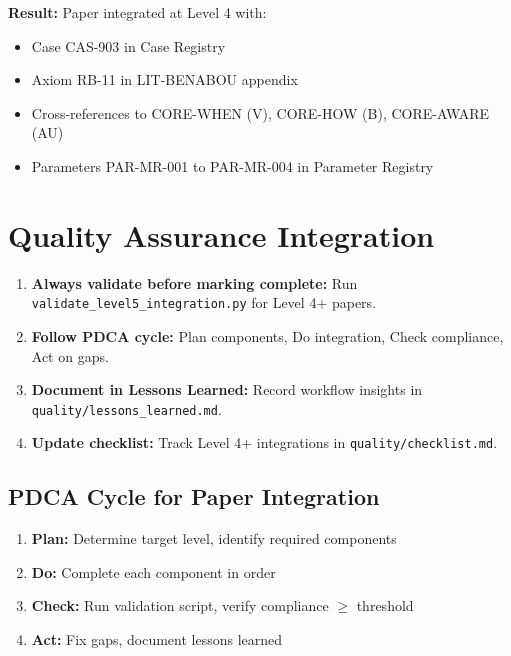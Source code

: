 \textbf{Result:} Paper integrated at Level 4 with:
\begin{itemize}[nosep]
\item Case CAS-903 in Case Registry
\item Axiom RB-11 in LIT-BENABOU appendix
\item Cross-references to CORE-WHEN (V), CORE-HOW (B), CORE-AWARE (AU)
\item Parameters PAR-MR-001 to PAR-MR-004 in Parameter Registry
\end{itemize}


\section{Quality Assurance Integration}
\label{sec:paperint-qa}

\begin{tcolorbox}[colback=green!5!white, colframe=green!75!black,
    title=Practical Implications]
\begin{enumerate}
\item \textbf{Always validate before marking complete:} Run
      \texttt{validate\_level5\_integration.py} for Level 4+ papers.
\item \textbf{Follow PDCA cycle:} Plan components, Do integration,
      Check compliance, Act on gaps.
\item \textbf{Document in Lessons Learned:} Record workflow insights
      in \texttt{quality/lessons\_learned.md}.
\item \textbf{Update checklist:} Track Level 4+ integrations in
      \texttt{quality/checklist.md}.
\end{enumerate}
\end{tcolorbox}

\subsection{PDCA Cycle for Paper Integration}

\begin{enumerate}
\item \textbf{Plan:} Determine target level, identify required components
\item \textbf{Do:} Complete each component in order
\item \textbf{Check:} Run validation script, verify compliance $\geq$ threshold
\item \textbf{Act:} Fix gaps, document lessons learned
\end{enumerate}


